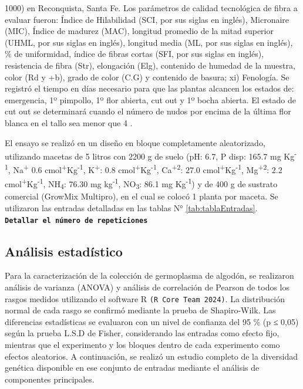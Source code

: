 \documentclass[12pt,oneside]{reedthesis}
\begin{document}
1000) en Reconquista, Santa Fe. Los parámetros de calidad tecnológica de fibra a evaluar fueron: Índice de Hilabilidad (SCI, por sus siglas en inglés), Micronaire (MIC), Índice de madurez (MAC), longitud promedio de la mitad superior (UHML, por sus siglas en inglés), longitud media (ML, por sus siglas en inglés), \% de uniformidad, índice de fibras cortas (SFI, por sus siglas en inglés), resistencia de fibra (Str), elongación (Elg), contenido de humedad de la muestra, color (Rd y +b), grado de color (C.G) y contenido de basura; xi) Fenología. Se registró el tiempo en días necesario para que las plantas alcancen los estados de: emergencia, 1º pimpollo, 1º flor abierta, cut out y 1º bocha abierta. El estado de cut out se determinará cuando el número de nudos por encima de la última flor blanca en el tallo sea menor que 4 \autocite{bourland1992}.

El ensayo se realizó en un diseño en bloque completamente aleatorizado, utilizando macetas de 5 litros con 2200 g de suelo (pH: 6.7, P disp: 165.7 mg Kg\textsuperscript{-1}, Na\textsuperscript{+} 0.6 cmol\textsuperscript{+}Kg\textsuperscript{-1}, K\textsuperscript{+}: 0.8 cmol\textsuperscript{+}Kg\textsuperscript{-1}, Ca\textsuperscript{+2}: 27.0 cmol\textsuperscript{+}Kg\textsuperscript{-1},
Mg\textsuperscript{+2}: 2.2 cmol\textsuperscript{+}Kg\textsuperscript{-1}, NH\textsubscript{4}: 76.30 mg kg\textsuperscript{-1}, NO\textsubscript{3}: 86.1 mg Kg\textsuperscript{-1}) y de 400 g de sustrato comercial (GrowMix Multipro), en el cual se colocó 1 planta por maceta. Se utilizaron las entradas detalladas en las tablas N° \ref{tab:tablaEntradas}. \textbf{\texttt{Detallar\ el\ número\ de\ repeticiones}}

\subsection{Análisis estadístico}\label{anuxe1lisis-estaduxedstico}

Para la caracterización de la colección de germoplasma de algodón, se realizaron análisis de varianza (ANOVA) y análisis de correlación de Pearson de todos los rasgos medidos utilizando el software R \texttt{(R\ Core\ Team\ 2024)}. La distribución normal de cada rasgo se confirmó mediante la prueba de Shapiro-Wilk. Las diferencias estadísticas se evaluaron con un nivel de confianza del 95 \% (p ≤ 0,05) según la prueba L.S.D de Fisher, considerando las entradas como efecto fijo, mientras que el experimento y los bloques dentro de cada experimento como efectos aleatorios. A continuación, se realizó un estudio completo de la diversidad genética disponible en ese conjunto de entradas mediante el análisis de componentes principales.
\end{document}
